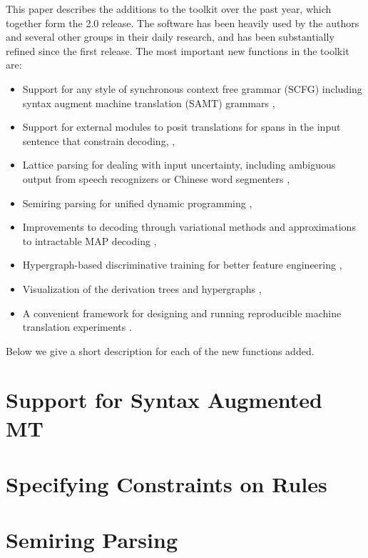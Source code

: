\documentclass[11pt]{article}
\begin{document}
This paper describes the additions to the toolkit over the past year, which together form the 2.0 release. The software has been heavily used by the authors and several other groups in their daily research, and has been substantially refined since the first release.  The most important new functions in the toolkit are: 
\begin{itemize}
\item
Support for any style of synchronous context free grammar (SCFG)
including syntax augment machine translation (SAMT) grammars \cite{samt2006},
\item
Support for external modules to posit translations for spans in the input sentence that constrain decoding,    \cite{PBML-2010-Joshua-transliteration},  
\item
Lattice parsing for dealing with input uncertainty, including ambiguous output from speech recognizers or Chinese word segmenters  \cite{dyer-muresan-resnik:2008:ACLMain},
\item
Semiring parsing for unified dynamic programming \cite{li-eisner:2009:EMNLP} , 
\item
Improvements to decoding through variational methods and approximations to intractable MAP decoding \cite{variational-decoding-acl09},
\item
Hypergraph-based discriminative training for better feature engineering \cite{zhifei-forest-reranking-galebook}, 
\item
Visualization of the derivation trees and hypergraphs \cite{PBML-2010-Joshua-visualization}, 
\item
A convenient framework for designing and running reproducible machine translation experiments \cite{Schwartz-wmt10-pipline}.
\end{itemize}
Below we give a short description for each of the new functions added.


\section{Support for Syntax Augmented MT}


\section{Specifying Constraints on Rules}

\section{Semiring Parsing}
\end{document}
